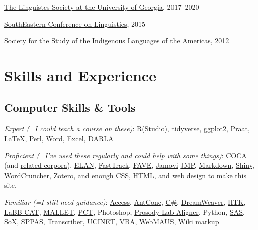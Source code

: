 \documentclass[
]{article}
\begin{document}
\href{https://www.linguistics.uga.edu/lsuga}{The Linguistcs Society at
the University of Georgia}, 2017--2020

\href{http://secol.org}{SouthEastern Conference on Linguistics}, 2015

\href{http://www.ssila.org}{Society for the Study of the Indigenous
Languages of the Americas}, 2012

\hypertarget{skills-and-experience}{%
\section{Skills and Experience}\label{skills-and-experience}}

\hypertarget{computer-skills-tools}{%
\subsection{Computer Skills \& Tools}\label{computer-skills-tools}}

\emph{Expert (=I could teach a course on these)}: R(Studio), tidyverse,
ggplot2, Praat, LaTeX, Perl, Word, Excel,
\href{http://darla.dartmouth.edu}{DARLA}

\emph{Proficient (=I've used these regularly and could help with some
things)}: \href{http://corpus.byu.edu/coca/}{COCA} (and
\href{http://corpus.byu.edu}{related corpora}),
\href{https://archive.mpi.nl/tla/elan}{ELAN},
\href{https://github.com/santiagobarreda/FastTrack}{FastTrack},
\href{http://fave.ling.upenn.edu}{FAVE},
\href{https://www.jamovi.org}{Jamovi}
\href{http://www.jmp.com/en_us/home.html}{JMP},
\href{http://daringfireball.net/projects/markdown/}{Markdown},
\href{http://shiny.rstudio.com}{Shiny},
\href{http://www.wordcruncher.com/index.html}{WordCruncher},
\href{https://www.zotero.org}{Zotero}, and enough CSS, HTML, and web
design to make this site.

\emph{Familiar (=I still need guidance)}:
\href{https://products.office.com/en-US/access}{Access},
\href{http://www.laurenceanthony.net/software.html}{AntConc},
\href{https://en.wikipedia.org/wiki/C_Sharp_(programming_language)}{C\#},
\href{http://www.adobe.com/products/dreamweaver.html?sdid=KKQTJ\&mv=search\&s_kwcid=AL!3085!3!110812694443!e!!g!!dreamweaver\&ef_id=V7iPrwAAAUYcBTnE:20160826185837:s}{DreamWeaver},
\href{http://htk.eng.cam.ac.uk}{HTK},
\href{http://labbcat.sourceforge.net}{LaBB-CAT},
\href{http://mallet.cs.umass.edu/index.php}{MALLET},
\href{http://phonologicalcorpustools.github.io/CorpusTools/}{PCT},
Photoshop, \href{http://prosodylab.org/tools/aligner/}{Prosody-Lab
Aligner}, Python, \href{http://www.sas.com/}{SAS},
\href{http://sox.sourceforge.net}{SoX},
\href{http://www.sppas.org}{SPPAS},
\href{http://trans.sourceforge.net/en/presentation.php}{Transcriber},
\href{https://sites.google.com/site/ucinetsoftware/home}{UCINET},
\href{https://en.wikipedia.org/wiki/Visual_Basic_for_Applications}{VBA},
\href{http://clarin.phonetik.uni-muenchen.de/BASWebServices/\#/services/WebMAUSBasic}{WebMAUS},
\href{https://en.wikipedia.org/wiki/Help:Wiki_markup}{Wiki markup}
\end{document}
